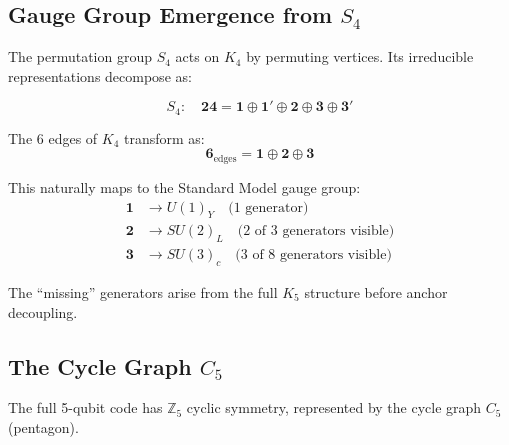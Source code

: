 \documentclass[11pt,a4paper]{article}
\theoremstyle{definition}
\begin{document}
\subsection{Gauge Group Emergence from $S_4$}

The permutation group $S_4$ acts on $K_4$ by permuting vertices. Its irreducible representations decompose as:

\begin{equation}
S_4: \quad \mathbf{24} = \mathbf{1} \oplus \mathbf{1'} \oplus \mathbf{2} \oplus \mathbf{3} \oplus \mathbf{3'}
\end{equation}

The 6 edges of $K_4$ transform as:
\begin{equation}
\mathbf{6}_{\text{edges}} = \mathbf{1} \oplus \mathbf{2} \oplus \mathbf{3}
\end{equation}

This naturally maps to the Standard Model gauge group:
\begin{align}
\mathbf{1} &\to U(1)_Y \quad \text{(1 generator)} \\
\mathbf{2} &\to SU(2)_L \quad \text{(2 of 3 generators visible)} \\
\mathbf{3} &\to SU(3)_c \quad \text{(3 of 8 generators visible)}
\end{align}

The ``missing'' generators arise from the full $K_5$ structure before anchor decoupling.

\subsection{The Cycle Graph $C_5$}

The full 5-qubit code has $\mathbb{Z}_5$ cyclic symmetry, represented by the cycle graph $C_5$ (pentagon).
\end{document}
